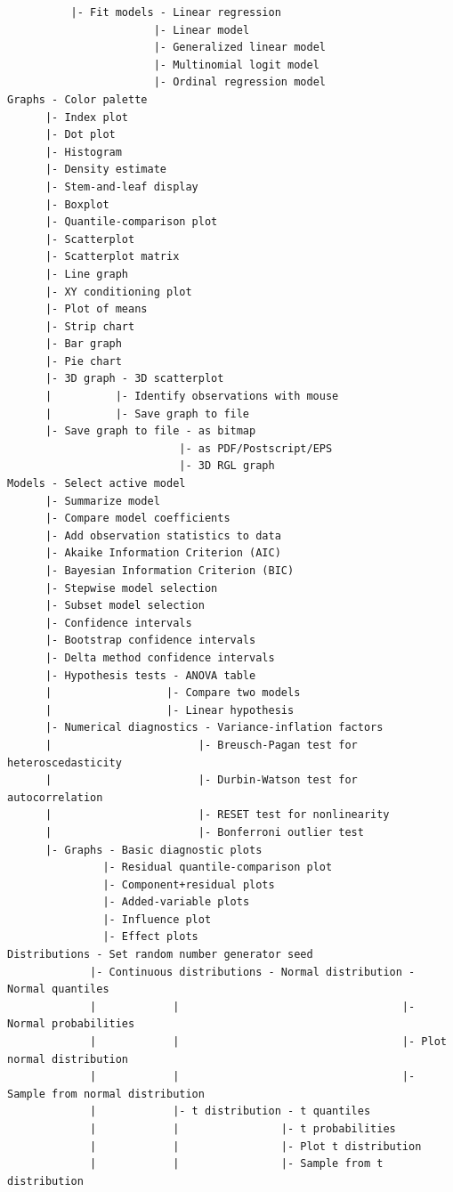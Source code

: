 \documentclass{article}%
\begin{document}
\begin{verbatim}
          |- Fit models - Linear regression
                       |- Linear model
                       |- Generalized linear model
                       |- Multinomial logit model
                       |- Ordinal regression model
Graphs - Color palette
      |- Index plot
      |- Dot plot
      |- Histogram
      |- Density estimate
      |- Stem-and-leaf display
      |- Boxplot
      |- Quantile-comparison plot
      |- Scatterplot
      |- Scatterplot matrix
      |- Line graph
      |- XY conditioning plot
      |- Plot of means
      |- Strip chart
      |- Bar graph
      |- Pie chart
      |- 3D graph - 3D scatterplot
      |          |- Identify observations with mouse
      |          |- Save graph to file
      |- Save graph to file - as bitmap
                           |- as PDF/Postscript/EPS
                           |- 3D RGL graph
Models - Select active model
      |- Summarize model
      |- Compare model coefficients
      |- Add observation statistics to data
      |- Akaike Information Criterion (AIC)
      |- Bayesian Information Criterion (BIC)
      |- Stepwise model selection
      |- Subset model selection
      |- Confidence intervals
      |- Bootstrap confidence intervals
      |- Delta method confidence intervals
      |- Hypothesis tests - ANOVA table
      |                  |- Compare two models
      |                  |- Linear hypothesis
      |- Numerical diagnostics - Variance-inflation factors
      |                       |- Breusch-Pagan test for heteroscedasticity
      |                       |- Durbin-Watson test for autocorrelation
      |                       |- RESET test for nonlinearity
      |                       |- Bonferroni outlier test
      |- Graphs - Basic diagnostic plots
               |- Residual quantile-comparison plot
               |- Component+residual plots
               |- Added-variable plots
               |- Influence plot
               |- Effect plots
Distributions - Set random number generator seed
             |- Continuous distributions - Normal distribution - Normal quantiles
             |            |                                   |- Normal probabilities
             |            |                                   |- Plot normal distribution
             |            |                                   |- Sample from normal distribution
             |            |- t distribution - t quantiles
             |            |                |- t probabilities
             |            |                |- Plot t distribution
             |            |                |- Sample from t distribution

\end{verbatim}
\end{document}
